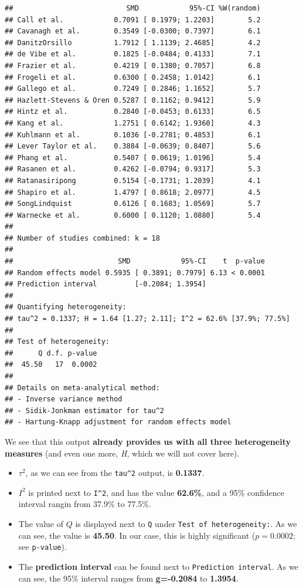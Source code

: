\documentclass[]{book}
\begin{document}
\begin{verbatim}
##                           SMD            95%-CI %W(random)
## Call et al.            0.7091 [ 0.1979; 1.2203]        5.2
## Cavanagh et al.        0.3549 [-0.0300; 0.7397]        6.1
## DanitzOrsillo          1.7912 [ 1.1139; 2.4685]        4.2
## de Vibe et al.         0.1825 [-0.0484; 0.4133]        7.1
## Frazier et al.         0.4219 [ 0.1380; 0.7057]        6.8
## Frogeli et al.         0.6300 [ 0.2458; 1.0142]        6.1
## Gallego et al.         0.7249 [ 0.2846; 1.1652]        5.7
## Hazlett-Stevens & Oren 0.5287 [ 0.1162; 0.9412]        5.9
## Hintz et al.           0.2840 [-0.0453; 0.6133]        6.5
## Kang et al.            1.2751 [ 0.6142; 1.9360]        4.3
## Kuhlmann et al.        0.1036 [-0.2781; 0.4853]        6.1
## Lever Taylor et al.    0.3884 [-0.0639; 0.8407]        5.6
## Phang et al.           0.5407 [ 0.0619; 1.0196]        5.4
## Rasanen et al.         0.4262 [-0.0794; 0.9317]        5.3
## Ratanasiripong         0.5154 [-0.1731; 1.2039]        4.1
## Shapiro et al.         1.4797 [ 0.8618; 2.0977]        4.5
## SongLindquist          0.6126 [ 0.1683; 1.0569]        5.7
## Warnecke et al.        0.6000 [ 0.1120; 1.0880]        5.4
## 
## Number of studies combined: k = 18
## 
##                         SMD            95%-CI    t  p-value
## Random effects model 0.5935 [ 0.3891; 0.7979] 6.13 < 0.0001
## Prediction interval         [-0.2084; 1.3954]              
## 
## Quantifying heterogeneity:
## tau^2 = 0.1337; H = 1.64 [1.27; 2.11]; I^2 = 62.6% [37.9%; 77.5%]
## 
## Test of heterogeneity:
##      Q d.f. p-value
##  45.50   17  0.0002
## 
## Details on meta-analytical method:
## - Inverse variance method
## - Sidik-Jonkman estimator for tau^2
## - Hartung-Knapp adjustment for random effects model
\end{verbatim}

We see that this output \textbf{already provides us with all three heterogeneity measures} (and even one more, \emph{H}, which we will not cover here).

\begin{itemize}
\item
  \(\tau^{2}\), as we can see from the \texttt{tau\^{}2} output, is \textbf{0.1337}.
\item
  \(I^{2}\) is printed next to \texttt{I\^{}2}, and has the value \textbf{62.6\%}, and a 95\% confidence interval rangin from 37.9\% to 77.5\%.
\item
  The value of \(Q\) is displayed next to \texttt{Q} under \texttt{Test\ of\ heterogeneity:}.
  As we can see, the value is \textbf{45.50}. In our case, this is highly significant (\(p=0.0002\); see \texttt{p-value}).
\item
  The \textbf{prediction interval} can be found next to \texttt{Prediction\ interval}. As we can see, the 95\% interval ranges from \textbf{g=-0.2084} to \textbf{1.3954}.
\end{itemize}
\end{document}
